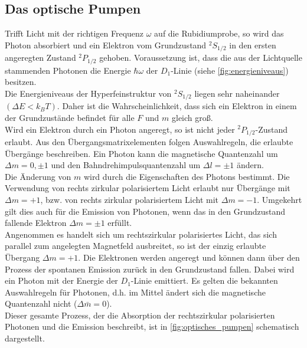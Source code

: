 \subsection{Das optische Pumpen}
Trifft Licht mit der richtigen Frequenz $\omega$ auf die Rubidiumprobe, so wird das Photon absorbiert und ein Elektron vom Grundzustand $^2S_{1/2}$ in den ersten angeregten Zustand $^2P_{1/2}$ gehoben.
Voraussetzung ist, dass die aus der Lichtquelle stammenden Photonen die Energie $\hbar \omega$ der $D_1$-Linie (siehe \autoref{fig:energieniveaus}) besitzen.
\\
Die Energieniveaus der Hyperfeinstruktur von $^2S_{1/2}$ liegen sehr naheinander $(\Delta E < k_B T)$.
Daher ist die Wahrscheinlichkeit, dass sich ein Elektron in einem der Grundzustände befindet für alle $F$ und $m$ gleich groß.
\\
Wird ein Elektron durch ein Photon angeregt, so ist nicht jeder $^2P_{1/2}$-Zustand erlaubt.
Aus den Übergangsmatrixelementen folgen Auswahlregeln, die erlaubte Übergänge beschreiben.
Ein Photon kann die magnetische Quantenzahl um $\Delta m = 0, \pm 1$ und den Bahndrehimpulsquantenzahl um $\Delta l = \pm 1$ ändern.
\\
Die Änderung von $m$ wird durch die Eigenschaften des Photons bestimmt.
Die Verwendung von rechts zirkular polarisiertem Licht erlaubt nur Übergänge mit $\Delta m = +1$, bzw. von rechts zirkular polarisiertem Licht mit $\Delta m = -1$.
Umgekehrt gilt dies auch für die Emission von Photonen, wenn das in den Grundzustand fallende Elektron $\Delta m = \pm 1$ erfüllt.
\\
Angenommen es handelt sich um rechtszirkular polarisiertes Licht, das sich parallel zum angelegten Magnetfeld ausbreitet, so ist der einzig erlaubte Übergang $\Delta m = +1$.
Die Elektronen werden angeregt und können dann über den Prozess der spontanen Emission zurück in den Grundzustand fallen.
Dabei wird ein Photon mit der Energie der $D_1$-Linie emittiert.
Es gelten die bekannten Auswahlregeln für Photonen, d.h. im Mittel ändert sich die magnetische Quantenzahl nicht ($\Delta \bar{m} = 0$).
\\
Dieser gesamte Prozess, der die Absorption der rechtszirkular polarisierten Photonen und die Emission beschreibt, ist in \autoref{fig:optisches_pumpen} schematisch dargestellt.
